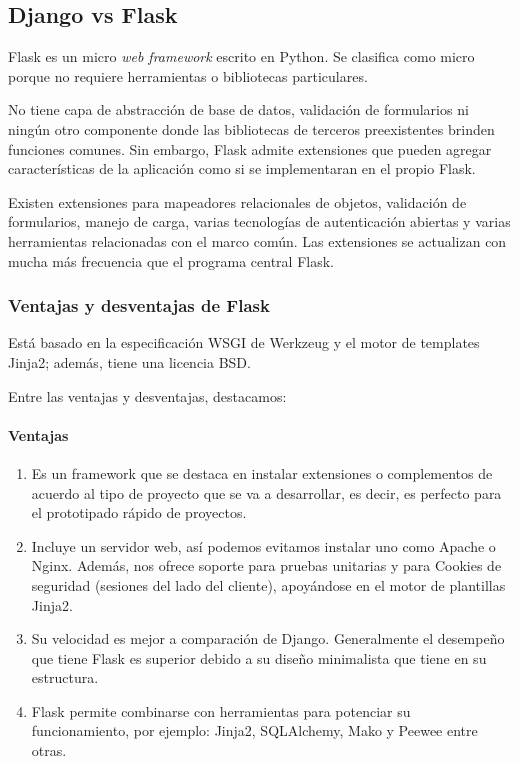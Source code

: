 \subsection{Django vs Flask}
Flask es un micro \textit{web framework} escrito en Python. Se clasifica como micro porque no requiere herramientas o bibliotecas particulares.


No tiene capa de abstracción de base de datos, validación de formularios ni ningún otro componente donde las bibliotecas de terceros preexistentes brinden funciones comunes. Sin embargo, Flask admite extensiones que pueden agregar características de la aplicación como si se implementaran en el propio Flask.


Existen extensiones para mapeadores relacionales de objetos, validación de formularios, manejo de carga, varias tecnologías de autenticación abiertas y varias herramientas relacionadas con el marco común. Las extensiones se actualizan con mucha más frecuencia que el programa central Flask.


\subsubsection*{Ventajas y desventajas de Flask}
Está basado en la especificación WSGI de Werkzeug y el motor de templates Jinja2; además, tiene una licencia BSD.


Entre las ventajas y desventajas, destacamos:

\paragraph*{Ventajas}
\begin{enumerate}
    \item Es un framework que se destaca en instalar extensiones o complementos de acuerdo al tipo de proyecto que se va a desarrollar, es decir, es perfecto para el prototipado rápido de proyectos.
    \item Incluye un servidor web, así podemos evitamos instalar uno como Apache o Nginx. Además, nos ofrece soporte para pruebas unitarias y para Cookies de seguridad (sesiones del lado del cliente), apoyándose en el motor de plantillas ​Jinja2​.
    \item Su velocidad es mejor a comparación de Django. Generalmente el desempeño que tiene Flask es superior debido a su diseño minimalista que tiene en su estructura.
    \item  Flask permite combinarse con herramientas para potenciar su funcionamiento, por ejemplo: Jinja2, SQLAlchemy, Mako y Peewee entre otras.
\end{enumerate}
